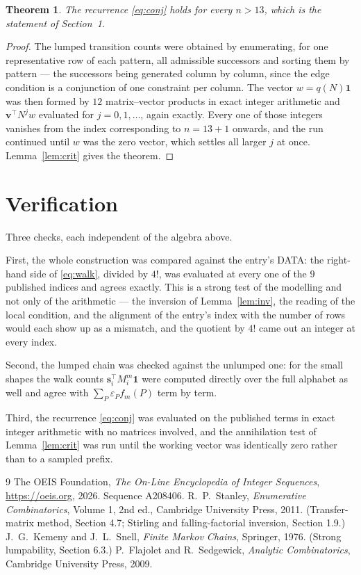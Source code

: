 \documentclass[11pt,a4paper]{article}
\theoremstyle{plain}
\newtheorem{theorem}{Theorem}
\theoremstyle{definition}
\begin{document}
\begin{theorem}
The recurrence \eqref{eq:conj} holds for every $n>13$, which is the statement of
Section~1.
\end{theorem}

\begin{proof}
The lumped transition counts were obtained by enumerating, for one representative row of
each pattern, all admissible successors and sorting them by pattern --- the successors being
generated column by column, since the edge condition is a conjunction of one constraint per
column. The vector $w=q(N)\mathbf{1}$ was then formed by $12$ matrix--vector products
in exact integer arithmetic and $\mathbf{v}^{\!\top}N^{j}w$ evaluated for
$j=0,1,\dots$, again exactly. Every one of those integers vanishes from the index
corresponding to $n=13+1$ onwards, and the run continued until $w$ was the zero vector,
which settles all larger $j$ at once. Lemma~\ref{lem:crit} gives the theorem.
\end{proof}

\section{Verification}

Three checks, each independent of the algebra above.

First, the whole construction was compared against the entry's DATA: the right-hand side of
\eqref{eq:walk}, divided by $4!$, was evaluated at every one of the $9$
published indices and agrees exactly. This is a strong test of the modelling and not only of
the arithmetic --- the inversion of Lemma~\ref{lem:inv}, the reading of the local
condition, and the alignment of the entry's index with the number of rows would each
show up as a mismatch, and the quotient by $4!$ came out an integer at every index.

Second, the lumped chain was checked against the unlumped one: for the small shapes the walk
counts $\mathbf{s}_i^{\!\top}M_i^{m}\mathbf{1}$ were computed directly over the full
alphabet as well and agree with $\sum_P\varepsilon_Pf_m(P)$ term by term.

Third, the recurrence \eqref{eq:conj} was evaluated on the published terms in exact integer
arithmetic with no matrices involved, and the annihilation test of Lemma~\ref{lem:crit} was
run until the working vector was identically zero rather than to a sampled prefix.

\begin{thebibliography}{9}
 The OEIS Foundation, \emph{The On-Line Encyclopedia of Integer
Sequences}, \url{https://oeis.org}, 2026. Sequence A208406.
 R.~P.~Stanley, \emph{Enumerative Combinatorics}, Volume 1, 2nd ed.,
Cambridge University Press, 2011. (Transfer-matrix method, Section 4.7; Stirling and
falling-factorial inversion, Section 1.9.)
 J.~G.~Kemeny and J.~L.~Snell, \emph{Finite Markov Chains}, Springer,
1976. (Strong lumpability, Section 6.3.)
 P.~Flajolet and R.~Sedgewick, \emph{Analytic Combinatorics}, Cambridge
University Press, 2009.
\end{thebibliography}
\end{document}
